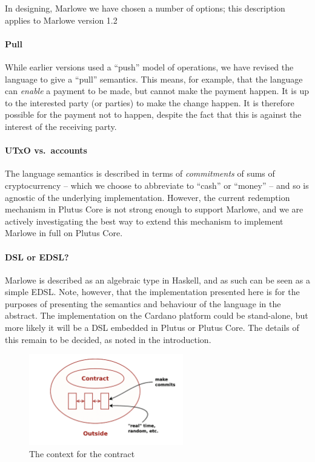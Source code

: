 \documentclass[
      acmsmall
    , screen
  ]{acmart}
\begin{document}
In designing, Marlowe we have chosen a number of options; this description applies to Marlowe version 1.2 

\paragraph{Pull} 

While earlier versions used a ``push'' model of operations, we have revised the language to give a ``pull'' semantics. 
This means, for example, that the language can \emph{enable} a payment to be made, but cannot make the payment happen. 
It is up to the interested party (or parties) to make the change happen. It is therefore possible for the payment not to 
happen, despite the fact that this is against the interest of the receiving party.


\paragraph{UTxO vs.\ accounts}

The language semantics is described in terms of \emph{commitments} of sums of cryptocurrency -- which we choose to 
abbreviate to ``cash'' or ``money'' -- and so is agnostic of the underlying implementation.  However, the current 
redemption mechanism in Plutus Core is not strong enough to support Marlowe, and we are actively investigating the best 
way to extend this mechanism to implement Marlowe in full on Plutus Core.

\paragraph{DSL or EDSL?}

Marlowe is described as an algebraic  type in Haskell, and as such can be seen as a simple EDSL. Note, however, that the implementation presented here is for the purposes of presenting the semantics and behaviour of the language in the abstract. The implementation on the Cardano platform could be stand-alone, but more likely it will be a DSL embedded in Plutus or Plutus Core. The details of this remain to be decided, as noted in the introduction.

\begin{figure}[t]
\begin{center}
\includegraphics[width=0.6\textwidth]{pix/context.png}
\caption{The context for the contract}
\label{fig:context}
\end{center}
\end{figure}
\end{document}
